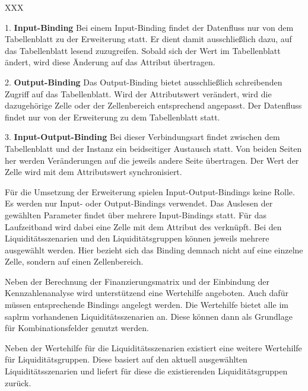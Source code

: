 \begin{onehalfspacing}
\begin{seToplist}{ XXX }

\item[1.] \textbf{Input-Binding} \newline
Bei einem Input-Binding findet der Datenfluss nur von dem Tabellenblatt zu der Erweiterung statt. Er dient damit ausschließlich dazu, auf das Tabellenblatt lesend zuzugreifen. Sobald sich der Wert im Tabellenblatt ändert, wird diese Änderung auf das Attribut übertragen.

\item[2.] \textbf{Output-Binding} \newline
Das Output-Binding bietet ausschließlich schreibenden Zugriff auf das Tabellenblatt. Wird der Attributswert verändert, wird die dazugehörige Zelle oder der Zellenbereich entsprechend angepasst. Der Datenfluss findet nur von der Erweiterung zu dem Tabellenblatt statt.

\item[3.] \textbf{Input-Output-Binding} \newline
Bei dieser Verbindungsart findet zwischen dem Tabellenblatt und der Instanz ein beidseitiger Austausch statt. Von beiden Seiten her werden Veränderungen auf die jeweils andere Seite übertragen. Der Wert der Zelle wird mit dem Attributswert synchronisiert.

\end{seToplist}

Für die Umsetzung der Erweiterung spielen Input-Output-Bindings keine Rolle. Es werden nur Input- oder Output-Bindings verwendet. Das Auslesen der gewählten Parameter findet über mehrere Input-Bindings statt. Für das Laufzeitband wird dabei eine Zelle mit dem Attribut  des  verknüpft. Bei den Liquiditätsszenarien und den Liquiditätsgruppen können jeweils mehrere ausgewählt werden. Hier bezieht sich das Binding demnach nicht auf eine einzelne Zelle, sondern auf einen Zellenbereich.

Neben der Berechnung der Finanzierungsmatrix und der Einbindung der Kennzahlenanalyse wird unterstützend eine Wertehilfe angeboten. Auch dafür müssen entsprechende Bindings angelegt werden. Die Wertehilfe bietet alle im \gls{saplrm} vorhandenen Liquiditätsszenarien an. Diese können dann als Grundlage für Kombinationsfelder genutzt werden.

Neben der Wertehilfe für die Liquiditätsszenarien existiert eine weitere Wertehilfe für Liquiditätsgruppen. Diese basiert auf den aktuell ausgewählten Liquiditätsszenarien und liefert für diese die existierenden Liquiditätsgruppen zurück.


\end{onehalfspacing}
